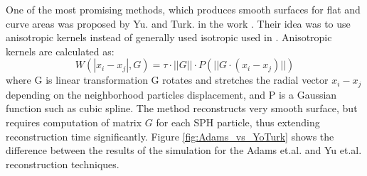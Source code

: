 One of the most promising methods, which produces smooth surfaces for flat and curve areas was proposed by Yu. and Turk. in the work \cite{YuTurk}. Their idea was to use anisotropic kernels instead of generally used isotropic used in \cite{Muller}. Anisotropic kernels are calculated as:
\begin{equation}
	W(|x_i - x_j|, G) = \tau \cdot  ||G|| \cdot P(||G \cdot (x_i - x_j)||)
\end{equation}
where G is linear transformation G rotates and stretches the radial vector $x_i - x_j$ depending on the neighborhood particles displacement, and P is a Gaussian function such as cubic spline. The method reconstructs very smooth surface, but requires computation of matrix $G$ for each SPH particle, thus extending reconstruction time significantly. Figure \ref{fig:Adams_vs_YoTurk} shows the difference between the results of the simulation for the Adams et.al. and Yu et.al. reconstruction techniques.
